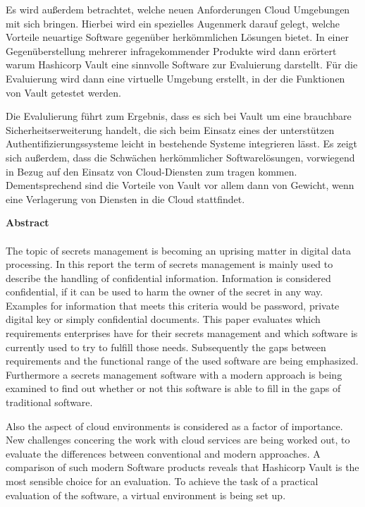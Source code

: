\documentclass[
book,
a4paper,   
titlepage,  
halfparskip,
12pt        
]{scrartcl}
\begin{document}
Es wird außerdem betrachtet, welche neuen
Anforderungen Cloud Umgebungen mit sich bringen. Hierbei wird ein spezielles Augenmerk darauf gelegt,
welche Vorteile neuartige Software gegenüber herkömmlichen Lösungen bietet. 
In einer Gegenüberstellung mehrerer infragekommender Produkte wird dann erörtert warum Hashicorp Vault
eine sinnvolle Software zur Evaluierung darstellt. Für die Evaluierung wird dann eine virtuelle 
Umgebung erstellt, in der die Funktionen von Vault getestet werden.

Die Evalulierung führt zum Ergebnis, dass es sich bei Vault um eine brauchbare Sicherheitserweiterung handelt,
die sich beim Einsatz eines der unterstützen Authentifizierungssysteme leicht in bestehende Systeme integrieren lässt.
Es zeigt sich außerdem, dass die Schwächen herkömmlicher Softwarelösungen, vorwiegend in Bezug auf den Einsatz von Cloud-Diensten zum tragen kommen. Dementsprechend sind die Vorteile von Vault vor allem dann von Gewicht, wenn eine Verlagerung von Diensten in die Cloud stattfindet.
\newpage
\thispagestyle{empty}

\large{\textbf{Abstract}}\\
\\
The topic of secrets management is becoming an uprising matter in digital data processing.
In this report the term of secrets management is mainly used to describe the handling of confidential information.
Information is considered confidential, if it can be used to harm the owner of the secret in any way.  
Examples for information that meets this criteria would be password, private digital key or simply confidential documents.
This paper evaluates which requirements enterprises have for their secrets management and which software is currently used to try to fulfill those needs.
Subsequently the gaps between requirements and the functional range of the used software are being emphasized.
Furthermore a secrets management software with a modern approach is being examined to find out whether or not this software is able to fill in the gaps of traditional software.

Also the aspect of cloud environments is considered as a factor of importance. New challenges concering the work with cloud services are being worked out, to evaluate the differences between conventional and modern approaches. A comparison of such modern Software products reveals that Hashicorp Vault is the most sensible choice for an evaluation. To achieve the task of a practical evaluation of the software, a virtual environment is being set up.
\end{document}
